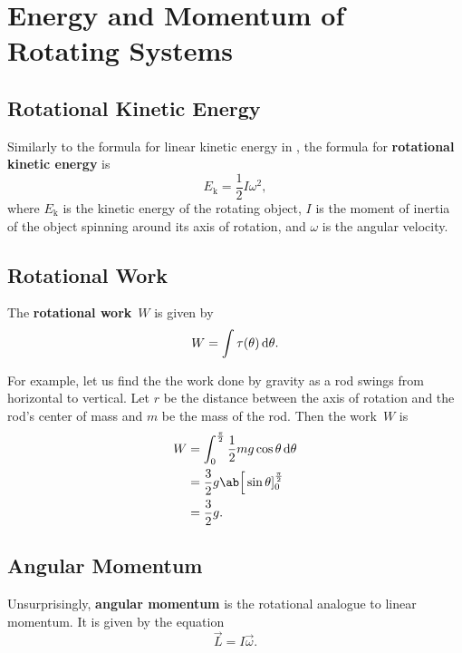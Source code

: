 \chapter{Energy and Momentum of Rotating Systems}


\section{Rotational Kinetic Energy}

Similarly to the formula for linear kinetic energy in
,
the formula for \textbf{rotational kinetic energy} is
\begin{equation}
    E_\mathrm{k} = \frac{1}{2} I \omega^2,
\end{equation}
where \(E_\mathrm{k}\) is the kinetic energy of the rotating object,
\(I\) is the moment of inertia of the object spinning around its axis
of rotation,
and \(\omega\) is the angular velocity.

\section{Rotational Work}

The \textbf{rotational work}~\(W\) is given by
\begin{equation}
    W = \int \tau(\theta) \odif{\theta}.
\end{equation}

For example, let us find the the work done by gravity
as a rod swings from horizontal to vertical.
Let \(r\) be the distance between the axis of rotation and the rod's
center of mass
and \(m\) be the mass of the rod.
Then the work~\(W\) is
\begin{equation}
    \begin{aligned}
        W &= \int_{0}^\frac{\pi}{2} \frac{1}{2} m g \cos\theta \odif{\theta} \\
        &= \frac{3}{2} g \ab\Big[\sin\theta]_0^\frac{\pi}{2} \\
        &= \frac{3}{2} g.
    \end{aligned}
\end{equation}

\section{Angular Momentum}

Unsurprisingly, \textbf{angular momentum} is the rotational analogue
to linear momentum.
It is given by the equation
\begin{equation}
    \vec{L} = I \vec{\omega}.
\end{equation}

